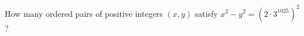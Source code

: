 How many ordered pairs of positive integers $(x,y)$ satisfy $x^2-y^2=\left(2\cdot3^{1025}\right)^2$?
